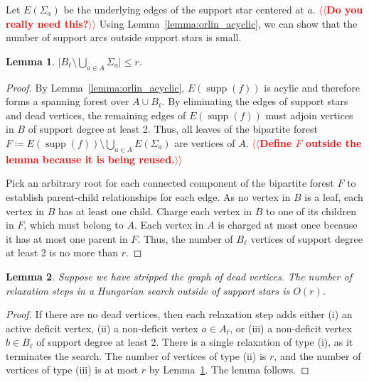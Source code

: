 \documentclass[11pt]{article}
\makeatletter
\def\abs#1{\mathopen| #1 \mathclose|}		%
\def\supp{\operatorname{supp}}
\theoremstyle{plain}
\newtheorem{lemma}{Lemma}[section]
\numberwithin{figure}{section}
\def\EMPH#1{\textbf{\boldmath #1}}
\def\n@te#1{\textsf{\boldmath \textbf{$\langle\!\langle$#1$\rangle\!\rangle$}}\leavevmode}
\def\note#1{\textcolor{red}{\n@te{#1}}}
\makeatother
\begin{document}
Let \EMPH{$E(\Sigma_a)$} be the underlying edges of the support star centered at $a$. \note{Do you really need this?}
Using Lemma~\ref{lemma:orlin_acyclic}, we can show that the number of support
arcs outside support stars is small.

\begin{lemma}
\label{lemma:no_star_support_size}
$\abs{B_\ell \setminus \bigcup_{a \in A} \Sigma_a} \leq r$.
\end{lemma}

\begin{proof}
By Lemma~\ref{lemma:orlin_acyclic}, $E(\supp(f))$ is acylic and therefore forms
a spanning forest over $A \cup B_\ell$.
By eliminating the edges of support stars and dead vertices, the remaining
edges of $E(\supp(f))$ must adjoin vertices in $B$ of support degree at least 2.
Thus, all leaves of the bipartite forest $F \coloneqq E(\supp(f)) \setminus \bigcup_{a \in A} E(\Sigma_a)$ are vertices of $A$. \note{Define $F$ outside the lemma because it is being reused.}

Pick an arbitrary root for each connected component of the bipartite forest $F$ to establish parent-child
relationships for each edge.
As no vertex in $B$ is a leaf, each vertex in $B$ has at least one child.
Charge each vertex in $B$ to one of its children in $F$, which must belong to $A$.
Each vertex in $A$ is charged at most once because it has at most one parent in $F$.
Thus, the number of $B_\ell$ vertices of support degree at least 2 is no more
than $r$.
\end{proof}

\begin{lemma}
\label{lemma:orlin_relax_count}
Suppose we have stripped the graph of dead vertices.
The number of relaxation steps in a Hungarian search outside of support stars
is $O(r)$.
\end{lemma}

\begin{proof}
If there are no dead vertices, then each relaxation step adds either
(i) an active deficit vertex,
(ii) a non-deficit vertex $a \in A_\ell$, or
(iii) a non-deficit vertex $b \in B_\ell$ of support degree at least 2.
There is a single relaxation of type (i), as it terminates the search.
The number of vertices of type (ii) is $r$, and the number of vertices of type
(iii) is at most $r$ by Lemma~\ref{lemma:no_star_support_size}.
The lemma follows.
\end{proof}
\end{document}
